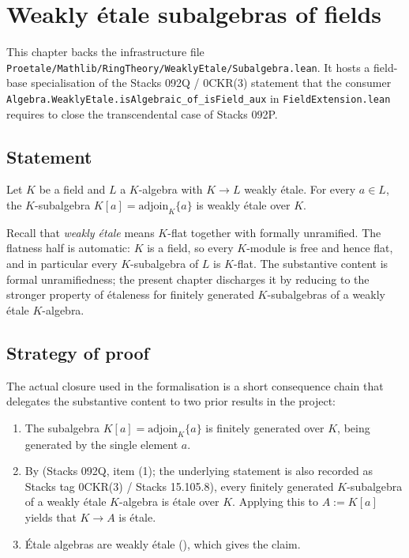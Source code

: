 \chapter{Weakly étale subalgebras of fields}
\label{ch:mathlib-weakly-etale-subalgebra}

This chapter backs the infrastructure file
\texttt{Proetale/Mathlib/RingTheory/WeaklyEtale/Subalgebra.lean}. It hosts a
field-base specialisation of the Stacks 092Q / 0CKR(3) statement that the
consumer \texttt{Algebra.WeaklyEtale.isAlgebraic\_of\_isField\_aux} in
\texttt{FieldExtension.lean} requires to close the transcendental case of
Stacks 092P.

\section{Statement}

\begin{lemma}
  \label{lem:weakly-etale-adjoin-singleton}
  Let $K$ be a field and $L$ a $K$-algebra with $K \to L$ weakly étale.
  For every $a \in L$, the $K$-subalgebra $K[a] = \mathrm{adjoin}_K\{a\}$
  is weakly étale over $K$.
\end{lemma}

Recall that \emph{weakly étale} means $K$-flat together with formally
unramified. The flatness half is automatic: $K$ is a field, so every
$K$-module is free and hence flat, and in particular every $K$-subalgebra
of $L$ is $K$-flat. The substantive content is formal unramifiedness; the
present chapter discharges it by reducing to the stronger property of
étaleness for finitely generated $K$-subalgebras of a weakly étale
$K$-algebra.

\section{Strategy of proof}

The actual closure used in the formalisation is a short consequence chain
that delegates the substantive content to two prior results in the
project:

\begin{enumerate}
  \item The subalgebra $K[a] = \mathrm{adjoin}_K\{a\}$ is finitely
    generated over $K$, being generated by the single element $a$.
  \item By
     (Stacks 092Q,
    item (1); the underlying statement is also recorded as Stacks
    tag 0CKR(3) / Stacks 15.105.8), every finitely generated
    $K$-subalgebra of a weakly étale $K$-algebra is étale over $K$.
    Applying this to $A := K[a]$ yields that $K \to A$ is étale.
  \item Étale algebras are weakly étale
    (), which gives the claim.
\end{enumerate}


